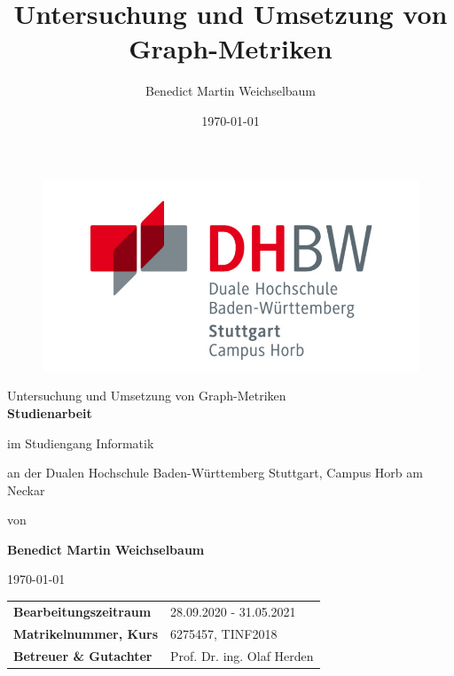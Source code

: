 \documentclass[a4paper,12pt,ngerman,chapterprefix=false,listof=totoc,bibliography=totoc]{scrreprt}
\begin{document}
\title{\Large{Untersuchung und Umsetzung von Graph-Metriken
}}
\author{Benedict Martin Weichselbaum}
\date{\today}
\begin{titlepage}
	\centering\hspace{8mm}
	\begin{figure}
		\centering
			\includegraphics[scale=1.3]{./Abbildungen/dhbwlogo.png}
	\end{figure}
	
	\vspace{5mm}	
	{\fontsize{26}{40}\selectfont
	Untersuchung und Umsetzung von Graph-Metriken
	}
	\\
	\vspace{2cm}
	\textbf{\Large{Studienarbeit}} \par
	\vspace{1cm}
	im Studiengang Informatik \par
	\vspace{0.3cm}
	an der Dualen Hochschule Baden-Württemberg Stuttgart, Campus Horb am Neckar \par
	\vspace{1.2cm}
	von \par
	\vspace{0.5cm}
	\textbf{\large{Benedict Martin Weichselbaum}} \par
	\vspace{1.5cm}
	{\today}\par
	\vfill
	\begin{table}[ht]
		\hspace{1,5cm}
		\begin{tabular}{p{7cm}p{7cm}}
			\textbf{Bearbeitungszeitraum} & 28.09.2020 - 31.05.2021\\
			\textbf{Matrikelnummer, Kurs} & 6275457, TINF2018\\
			\textbf{Betreuer \& Gutachter} & Prof. Dr. ing. Olaf Herden\\
		\end{tabular}
	\end{table}
\end{titlepage}
\end{document}
